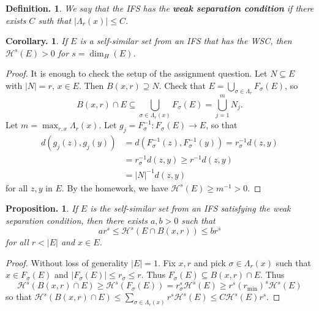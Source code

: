 \documentclass[11pt, a4paper]{memoir}
\theoremstyle{change}
\newtheorem{corollary}[theorem]{Corollary.}
\newtheorem{proposition}[theorem]{Proposition.}
\theoremstyle{plain}
\theoremstyle{nonumberplain}
\newtheorem{definition}{Definition.}
\newtheorem{proof}{Proof}
\newcommand{\defn}[1]{{\boldmath\bfseries #1}}
\numberwithin{equation}{section}
\begin{document}
\begin{definition}
    We say that the IFS has the \defn{weak separation condition} if there exists $C$ suth that $|\Lambda_r(x)|\leq C$.
\end{definition}
\begin{corollary}
    If $E$ is a self-similar set from an IFS that has the WSC, then $\mathcal{H}^s(E)>0$ for $s=\dim_H(E)$.
\end{corollary}
\begin{proof}
    It is enough to check the setup of the assignment question.
    Let $N\subseteq E$ with $|N|=r$, $x\in E$.
    Then $B(x,r)\supseteq N$.
    Check that $E=\bigcup_{\sigma\in\Lambda_r}F_\sigma(E)$, so
    \begin{equation*}
        B(x,r)\cap E\subseteq\bigcup_{\sigma\in\Lambda_r(x)}F_\sigma(E)=\bigcup_{j=1}^m N_j.
    \end{equation*}
    Let $m=\max_{r,x}\Lambda_r(x)$.
    Let $g_j=F_\sigma^{-1}:F_\sigma(E)\to E$, so that
    \begin{align*}
        d(g_j(z),g_j(y))&=d(F_\sigma^{-1}(z),F_\sigma^{-1}(y))=r_\sigma^{-1}d(z,y)\\
                        &= r_\sigma^{-1}d(z,y)\geq r^{-1}d(z,y)\\
                        &= |N|^{-1}d(z,y)
    \end{align*}
    for all $z,y$ in $E$.
    By the homework, we have $\mathcal{H}^s(E)\geq m^{-1}>0$.
\end{proof}
\begin{proposition}
    If $E$ is the self-similar set from an IFS satisfying the weak separation condition, then there exists $a,b>0$ such that
    \begin{equation*}
        ar^s\leq\mathcal{H}^s(E\cap B(x,r))\leq br^s
    \end{equation*}
    for all $r<|E|$ and $x\in E$.
\end{proposition}
\begin{proof}
    Without loss of generality $|E|=1$.
    Fix $x,r$ and pick $\sigma\in\Lambda_r(x)$ such that $x\in F_\sigma(E)$ and $|F_\sigma(E)|\leq r_\sigma\leq r$.
    Thus $F_\sigma(E)\subseteq B(x,r)\cap E$.
    Thus
    \begin{equation*}
        \mathcal{H}^s(B(x,r)\cap E)\geq\mathcal{H}^s(F_\sigma(E))=r_\sigma^s\mathcal{H}^s(E)\geq r^s(r_{\min})^s\mathcal{H}^s(E)
    \end{equation*}
    so that $\mathcal{H}^s(B(x,r)\cap E)\leq\sum_{\sigma\in\Lambda_r(x)}r^s\mathcal{H}^s(E)\leq C\mathcal{H}^s(E)r^s$.
\end{proof}
\end{document}
